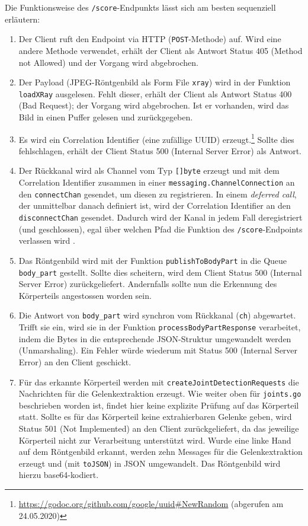 Die Funktionsweise des \texttt{/score}-Endpunkts lässt sich am besten sequenziell erläutern:

\begin{enumerate}
    \item Der Client ruft den Endpoint via HTTP (\texttt{POST}-Methode) auf. Wird eine andere Methode verwendet, erhält der Client als Antwort Status 405 (Method not Allowed) und der Vorgang wird abgebrochen.
    \item Der Payload (JPEG-Röntgenbild als Form File \texttt{xray}) wird in der Funktion \texttt{loadXRay} ausgelesen. Fehlt dieser, erhält der Client als Antwort Status 400 (Bad Request); der Vorgang wird abgebrochen. Ist er vorhanden, wird das Bild in einen Puffer gelesen und zurückgegeben.
    \item Es wird ein Correlation Identifier (eine zufällige UUID) erzeugt.\footnote{\url{https://godoc.org/github.com/google/uuid\#NewRandom} (abgerufen am 24.05.2020)} Sollte dies fehlschlagen, erhält der Client Status 500 (Internal Server Error) als Antwort.
    \item Der Rückkanal wird als Channel vom Typ \texttt{[]byte} erzeugt und mit dem Correlation Identifier zusammen in einer \texttt{messaging.ChannelConnection} an den \texttt{connectChan} gesendet, um diesen zu registrieren. In einem \textit{deferred call}, der unmittelbar danach definiert ist, wird der Correlation Identifier an den \texttt{disconnectChan} gesendet. Dadurch wird der Kanal in jedem Fall deregistriert (und geschlossen), egal über welchen Pfad die Funktion des \texttt{/score}-Endpoints verlassen wird \cite[S. 145]{gopl}.
    \item Das Röntgenbild wird mit der Funktion \texttt{publishToBodyPart} in die Queue \texttt{body\_part} gestellt. Sollte dies scheitern, wird dem Client Status 500 (Internal Server Error) zurückgeliefert. Andernfalls sollte nun die Erkennung des Körperteils angestossen worden sein.
    \item Die Antwort von \texttt{body\_part} wird synchron vom Rückkanal (\texttt{ch}) abgewartet. Trifft sie ein, wird sie in der Funktion \texttt{processBodyPartResponse} verarbeitet, indem die Bytes in die entsprechende JSON-Struktur umgewandelt werden (Unmarshaling). Ein Fehler würde wiederum mit Status 500 (Internal Server Error) an den Client geschickt.
    \item Für das erkannte Körperteil werden mit \texttt{createJointDetectionRequests} die Nachrichten für die Gelenkextraktion erzeugt. Wie weiter oben für \texttt{joints.go} beschrieben worden ist, findet hier keine explizite Prüfung auf das Körperteil statt. Sollte es für das Körperteil keine extrahierbaren Gelenke geben, wird Status 501 (Not Implemented) an den Client zurückgeliefert, da das jeweilige Körperteil nicht zur Verarbeitung unterstützt wird. Wurde eine linke Hand auf dem Röntgenbild erkannt, werden zehn Messages für die Gelenkextraktion erzeugt und (mit \texttt{toJSON}) in JSON umgewandelt. Das Röntgenbild wird hierzu base64-kodiert.

\end{enumerate}

